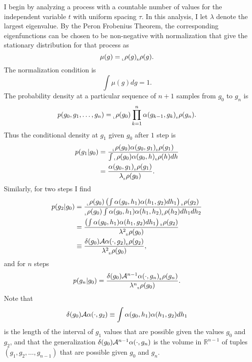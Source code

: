 \documentclass[12pt]{article} \usepackage{amsmath,amsfonts}
\newcommand{\Aop}{{\cal A}}
\newcommand{\Aindicate}{\alpha}
\newcommand{\density}{p}
\newcommand{\stationary}{\mu}
\newcommand{\rightfunction}{{_{_{\scalebox{.4}{R}}} \rho}}
\newcommand{\leftfunction}{{_{_{\scalebox{.4}{L}}} \rho}}
\newcommand{\field}[1]{\mathbb{#1}}
\newcommand\REAL{\field{R}}
\begin{document}
I begin by analyzing a process with a countable number of values for
the independent variable $t$ with uniform spacing $\tau$.  In this
analysis, I let $\lambda$ denote the largest eigenvalue.  By the Peron
Frobenius Theorem, the corresponding eigenfunctions can be chosen to
be non-negative with normalization that give the stationary
distribution for that process as
\begin{equation}
  \label{eq:stationary}
  \stationary(g) = \leftfunction(g) \rightfunction(g).
\end{equation}
The normalization condition is
\begin{equation*}
  \int \stationary(g) dg = 1.
\end{equation*}
The probability density at a particular sequence of $n+1$ samples from
$g_0$ to $g_n$ is
\begin{equation}
  \label{eq:joint}
  \density(g_0, g_1, \ldots , g_n) = \leftfunction(g_0) \prod_{k=1}^n
  \Aindicate(g_{k-1},g_k) \rightfunction(g_n).
\end{equation}
Thus the conditional density at $g_1$ given $g_0$ after $1$ step is
\begin{align}
  \density(g_1 | g_0) &= \frac{\leftfunction(g_0)
  \Aindicate(g_0,g_1) \rightfunction(g_1)}{ \int \leftfunction(g_0)
  \Aindicate(g_0,h) \rightfunction(h) dh} \nonumber \\
  \label{eq:one_step}
  &= \frac{\Aindicate(g_0,g_1)
    \rightfunction(g_1)}{\lambda \rightfunction(g_0)}.
\end{align}
Similarly, for two steps I find
\begin{align}
  \density(g_2 | g_0) &= \frac{\leftfunction(g_0) \left( \int
      \Aindicate(g_0,h_1) \Aindicate(h_1,g_2) dh_1 \right)
      \rightfunction(g_2) } 
      { \leftfunction(g_0) \int
      \Aindicate(g_0,h_1) \Aindicate(h_1,h_2) \rightfunction(h_2) dh_1
      dh_2} \nonumber \\
  &= \frac{ \left( \int
      \Aindicate(g_0,h_1) \Aindicate(h_1,g_2) dh_1 \right)
      \rightfunction(g_2) } 
      { \lambda^2  \rightfunction(g_0)} \nonumber \\
  \label{eq:two_step}
  &\equiv \frac{\delta(g_0) \Aop \Aindicate(\cdot,g_2)
    \rightfunction(g_2)}{\lambda^2 \rightfunction(g_0)},
\end{align}
and for $n$ steps
\begin{equation}
  \label{eq:n_step}
  \density(g_n | g_0) = \frac{\delta(g_0) \Aop^{n-1} \Aindicate(\cdot,g_n)
    \rightfunction(g_n)}{\lambda^n \rightfunction(g_0)}.  
\end{equation}
Note that
\begin{equation*}
  \delta(g_0) \Aop \Aindicate(\cdot,g_2) \equiv \int
  \Aindicate(g_0,h_1) \Aindicate(h_1,g_2) dh_1
\end{equation*}
is the length of the interval of $g_1$ values that are possible given
the values $g_0$ and $g_2$, and that the generalization
$\delta(g_0) \Aop^{n-1} \Aindicate(\cdot,g_n)$ is the volume in
$\REAL^{n-1}$ of tuples $(g_1,g_2,\ldots,g_{n-1})$ that are possible
given $g_0$ and $g_n$.
\end{document}
